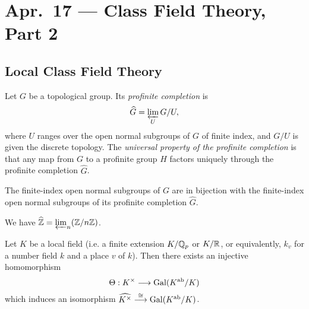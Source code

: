 \chapter{Apr.~17 --- Class Field Theory, Part 2}

\section{Local Class Field Theory}

\begin{definition}
  Let $G$ be a topological group. Its
  \emph{profinite completion} is
  \[
    \widehat{G} = \varprojlim_U G / U,
  \]
  where $U$ ranges over the open normal
  subgroups of $G$ of finite index, and
  $G / U$ is given the discrete topology.
  The \emph{universal property of the profinite completion}
  is that any map from $G$ to a profinite
  group $H$ factors uniquely through the
  profinite completion $\widehat{G}$.
\end{definition}

\begin{remark}
  The finite-index open normal subgroups
  of $G$ are in bijection with the
  finite-index open normal subgroups of
  its profinite completion $\widehat{G}$.
\end{remark}

\begin{example}
  We have $\widehat{\mathbb{Z}} = \varprojlim_n (\mathbb{Z} / n\mathbb{Z})$.
\end{example}

\begin{theorem}
  Let $K$ be a local field (i.e. a finite
  extension $K / \mathbb{Q}_p$ or $K / \mathbb{R}$, or
  equivalently, $k_v$ for a number field
  $k$ and a place $v$ of $k$). Then
  there exists an injective homomorphism
  \[
    \Theta : K^\times \longrightarrow
    \operatorname{Gal}(K^\mathrm{ab} / K)
  \]
  which induces an isomorphism
  $\widehat{K^\times} \overset{\cong}{\longrightarrow} \operatorname{Gal}(K^\mathrm{ab} / K)$.
\end{theorem}

